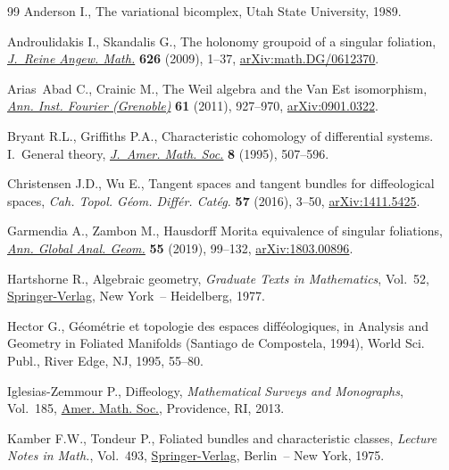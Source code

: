 \documentclass[11pt]{article}
\numberwithin{equation}{section}
\numberwithin{equation}{section}
\begin{document}
\begin{thebibliography}{99}
Anderson I., The variational bicomplex, Utah State University, 1989.

Androulidakis I., Skandalis G., The holonomy groupoid of a singular foliation,
 \href{https://doi.org/10.1515/CRELLE.2009.001}{\textit{J.~Reine Angew. Math.}} \textbf{626} (2009), 1--37,
 \href{https://arxiv.org/abs/math.DG/0612370}{arXiv:math.DG/0612370}.

Arias~Abad C., Crainic M., The {W}eil algebra and the {V}an {E}st isomorphism,
 \href{https://doi.org/10.5802/aif.2633}{\textit{Ann. Inst. Fourier (Grenoble)}} \textbf{61} (2011), 927--970,
 \href{https://arxiv.org/abs/0901.0322}{arXiv:0901.0322}.

Bryant R.L., Griffiths P.A., Characteristic cohomology of differential systems.
 {I}.~{G}eneral theory, \href{https://doi.org/10.2307/2152923}{\textit{J.~Amer. Math. Soc.}} \textbf{8} (1995),
 507--596.

Christensen J.D., Wu E., Tangent spaces and tangent bundles for diffeological
 spaces, \textit{Cah. Topol. G\'eom. Diff\'er. Cat\'eg.} \textbf{57} (2016),
 3--50, \href{https://arxiv.org/abs/1411.5425}{arXiv:1411.5425}.

Garmendia A., Zambon M., Hausdorff {M}orita equivalence of singular foliations,
 \href{https://doi.org/10.1007/s10455-018-9620-6}{\textit{Ann. Global Anal. Geom.}} \textbf{55} (2019), 99--132,
 \href{https://arxiv.org/abs/1803.00896}{arXiv:1803.00896}.

Hartshorne R., Algebraic geometry, \textit{Graduate Texts in Mathematics},
 Vol.~52, \href{https://doi.org/10.1007/978-1-4757-3849-0}{Springer-Verlag}, New York~-- Heidelberg, 1977.

Hector G., G\'eom\'etrie et topologie des espaces diff\'eologiques, in Analysis
 and Geometry in Foliated Manifolds ({S}antiago de {C}ompostela, 1994), World
 Sci. Publ., River Edge, NJ, 1995, 55--80.

Iglesias-Zemmour P., Diffeology, \textit{Mathematical Surveys and Monographs},
 Vol.~185, \href{https://doi.org/10.1090/surv/185}{Amer. Math. Soc.}, Providence, RI, 2013.

Kamber F.W., Tondeur P., Foliated bundles and characteristic classes,
 \textit{Lecture Notes in Math.}, Vol.~493, \href{https://doi.org/10.1007/BFb0081558}{Springer-Verlag}, Berlin~-- New
 York, 1975.


\end{thebibliography}
\end{document}

